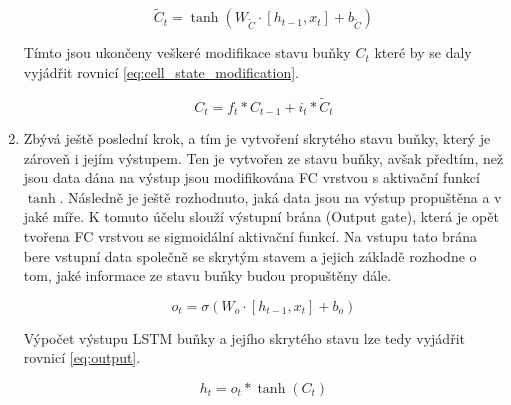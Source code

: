 \begin{enumerate}
\begin{equation}
\widetilde{C}_t = \tanh(W_{\widetilde{C}} \cdot [h_{t-1}, x_t] + b_{\widetilde{C}})
\label{eq:input_modulation_gate}
\end{equation}

Tímto jsou ukončeny veškeré modifikace stavu buňky \(C_t\) které by se daly vyjádřit rovnicí \ref{eq:cell_state_modification}.

\begin{equation}
C_t = f_t * C_{t-1} + i_t * \widetilde{C}_t
\label{eq:cell_state_modification}
\end{equation}



\item Zbývá ještě poslední krok, a tím je vytvoření skrytého stavu buňky, který je zároveň i jejím výstupem.
Ten je vytvořen ze stavu buňky, avšak předtím, než jsou data dána na výstup jsou modifikována FC vrstvou s aktivační funkcí \(\tanh\).
Následně je ještě rozhodnuto, jaká data jsou na výstup propuštěna a v jaké míře.
K tomuto účelu slouží výstupní brána (Output gate), která je opět tvořena FC vrstvou se sigmoidální aktivační funkcí.
Na vstupu tato brána bere vstupní data společně se skrytým stavem a jejich základě rozhodne o tom, jaké informace ze stavu buňky budou propuštěny dále.

\begin{equation}
o_t = \sigma(W_o \cdot [h_{t-1}, x_t] + b_o)
\label{eq:output_gate}
\end{equation}

Výpočet výstupu LSTM buňky a jejího skrytého stavu lze tedy vyjádřit rovnicí \ref{eq:output}.

\begin{equation}
h_t = o_t * \tanh(C_t)
\label{eq:output}
\end{equation}




\end{enumerate}




\endinput